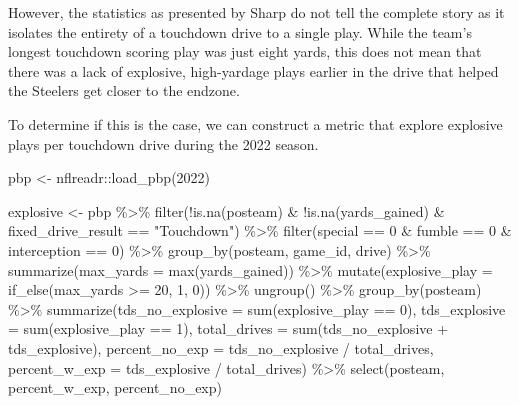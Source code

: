 \documentclass[
  letterpaper,
]{krantz}
\newenvironment{Shaded}{\begin{snugshade}}{\end{snugshade}}
\newcommand{\AttributeTok}[1]{\textcolor[rgb]{0.40,0.45,0.13}{#1}}
\newcommand{\DecValTok}[1]{\textcolor[rgb]{0.68,0.00,0.00}{#1}}
\newcommand{\FunctionTok}[1]{\textcolor[rgb]{0.28,0.35,0.67}{#1}}
\newcommand{\NormalTok}[1]{\textcolor[rgb]{0.00,0.23,0.31}{#1}}
\newcommand{\OtherTok}[1]{\textcolor[rgb]{0.00,0.23,0.31}{#1}}
\newcommand{\SpecialCharTok}[1]{\textcolor[rgb]{0.37,0.37,0.37}{#1}}
\newcommand{\StringTok}[1]{\textcolor[rgb]{0.13,0.47,0.30}{#1}}
\begin{document}
However, the statistics as presented by Sharp do not tell the complete
story as it isolates the entirety of a touchdown drive to a single play.
While the team's longest touchdown scoring play was just eight yards,
this does not mean that there was a lack of explosive, high-yardage
plays earlier in the drive that helped the Steelers get closer to the
endzone.

To determine if this is the case, we can construct a metric that explore
explosive plays per touchdown drive during the 2022 season.

\begin{Shaded}
\begin{Highlighting}[]
\NormalTok{pbp }\OtherTok{\textless{}{-}}\NormalTok{ nflreadr}\SpecialCharTok{::}\FunctionTok{load\_pbp}\NormalTok{(}\DecValTok{2022}\NormalTok{)}

\NormalTok{explosive }\OtherTok{\textless{}{-}}\NormalTok{ pbp }\SpecialCharTok{\%\textgreater{}\%}
  \FunctionTok{filter}\NormalTok{(}\SpecialCharTok{!}\FunctionTok{is.na}\NormalTok{(posteam) }\SpecialCharTok{\&}
           \SpecialCharTok{!}\FunctionTok{is.na}\NormalTok{(yards\_gained)}
         \SpecialCharTok{\&}\NormalTok{ fixed\_drive\_result }\SpecialCharTok{==} \StringTok{"Touchdown"}\NormalTok{) }\SpecialCharTok{\%\textgreater{}\%}
  \FunctionTok{filter}\NormalTok{(special }\SpecialCharTok{==} \DecValTok{0} \SpecialCharTok{\&}\NormalTok{ fumble }\SpecialCharTok{==} \DecValTok{0} \SpecialCharTok{\&}\NormalTok{ interception }\SpecialCharTok{==} \DecValTok{0}\NormalTok{) }\SpecialCharTok{\%\textgreater{}\%}
  \FunctionTok{group\_by}\NormalTok{(posteam, game\_id, drive) }\SpecialCharTok{\%\textgreater{}\%}
  \FunctionTok{summarize}\NormalTok{(}\AttributeTok{max\_yards =} \FunctionTok{max}\NormalTok{(yards\_gained)) }\SpecialCharTok{\%\textgreater{}\%}
  \FunctionTok{mutate}\NormalTok{(}\AttributeTok{explosive\_play =} \FunctionTok{if\_else}\NormalTok{(max\_yards }\SpecialCharTok{\textgreater{}=} \DecValTok{20}\NormalTok{, }\DecValTok{1}\NormalTok{, }\DecValTok{0}\NormalTok{)) }\SpecialCharTok{\%\textgreater{}\%}
  \FunctionTok{ungroup}\NormalTok{() }\SpecialCharTok{\%\textgreater{}\%}
  \FunctionTok{group\_by}\NormalTok{(posteam) }\SpecialCharTok{\%\textgreater{}\%}
  \FunctionTok{summarize}\NormalTok{(}\AttributeTok{tds\_no\_explosive =} \FunctionTok{sum}\NormalTok{(explosive\_play }\SpecialCharTok{==} \DecValTok{0}\NormalTok{),}
            \AttributeTok{tds\_explosive =} \FunctionTok{sum}\NormalTok{(explosive\_play }\SpecialCharTok{==} \DecValTok{1}\NormalTok{),}
            \AttributeTok{total\_drives =} \FunctionTok{sum}\NormalTok{(tds\_no\_explosive }\SpecialCharTok{+}\NormalTok{ tds\_explosive),}
            \AttributeTok{percent\_no\_exp =}\NormalTok{ tds\_no\_explosive }\SpecialCharTok{/}\NormalTok{ total\_drives,}
            \AttributeTok{percent\_w\_exp =}\NormalTok{ tds\_explosive }\SpecialCharTok{/}\NormalTok{ total\_drives) }\SpecialCharTok{\%\textgreater{}\%}
  \FunctionTok{select}\NormalTok{(posteam, percent\_w\_exp, percent\_no\_exp)}
\end{Highlighting}
\end{Shaded}
\end{document}

